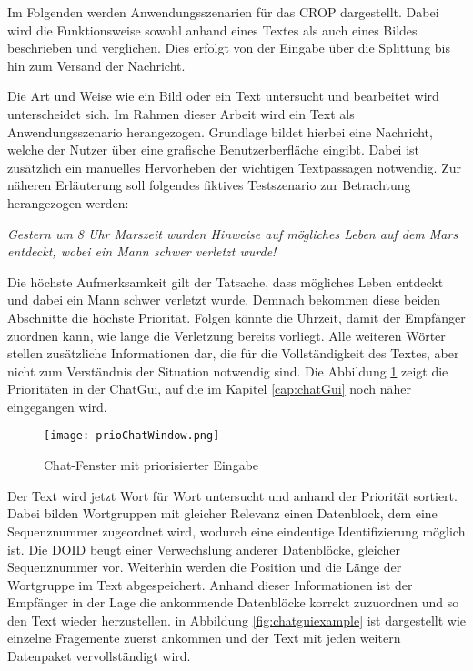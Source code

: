 \label{sec:Anwendungsszenarien}

Im Folgenden werden Anwendungsszenarien für das CROP dargestellt. Dabei wird die
Funktionsweise sowohl anhand eines Textes als auch eines Bildes beschrieben und
verglichen. Dies erfolgt von der Eingabe über die Splittung bis hin zum Versand
der Nachricht.

Die Art und Weise wie ein Bild oder ein Text untersucht und bearbeitet wird
unterscheidet sich. Im Rahmen dieser Arbeit wird ein Text als
Anwendungsszenario herangezogen. Grundlage bildet hierbei eine Nachricht,
welche der Nutzer über eine grafische Benutzerberfläche eingibt.
Dabei ist zusätzlich ein manuelles Hervorheben der wichtigen Textpassagen
notwendig. Zur näheren Erläuterung soll folgendes fiktives Testszenario zur
Betrachtung herangezogen werden:

\textit{\glqq Gestern um 8 Uhr Marszeit wurden Hinweise auf mögliches Leben auf
dem Mars entdeckt, wobei ein Mann schwer verletzt wurde! \grqq}

Die höchste Aufmerksamkeit gilt der Tatsache, dass mögliches Leben entdeckt und
dabei ein Mann schwer verletzt wurde. Demnach bekommen diese beiden Abschnitte
die höchste Priorität. Folgen könnte die Uhrzeit, damit der Empfänger zuordnen
kann, wie lange die Verletzung bereits vorliegt. Alle weiteren Wörter stellen
zusätzliche Informationen dar, die für die Vollständigkeit des Textes, aber
nicht zum Verständnis der Situation notwendig sind. Die Abbildung
\ref{fig:prioChatWindow} zeigt die Prioritäten in der ChatGui, auf die im
Kapitel \ref{cap:chatGui} noch näher eingegangen wird.

\begin{figure}[H]
	\centering
	\texttt{[image: prioChatWindow.png]}
	\label{fig:prioChatWindow}
	\caption{Chat-Fenster mit priorisierter Eingabe}
\end{figure}

Der Text wird jetzt Wort für Wort untersucht und anhand der Priorität sortiert.
Dabei bilden Wortgruppen mit gleicher Relevanz einen Datenblock, dem eine
Sequenznummer zugeordnet wird, wodurch eine eindeutige Identifizierung möglich
ist. Die \gls{DOID} beugt einer Verwechslung anderer Datenblöcke, gleicher
Sequenznummer vor. Weiterhin werden die Position und die Länge der Wortgruppe im
Text abgespeichert. Anhand dieser Informationen ist der Empfänger in der Lage
die ankommende Datenblöcke korrekt zuzuordnen und so den Text wieder herzustellen.
in Abbildung \ref{fig:chatguiexample} ist dargestellt wie einzelne Fragemente
zuerst ankommen und der Text mit jeden weitern Datenpaket vervollständigt wird.

